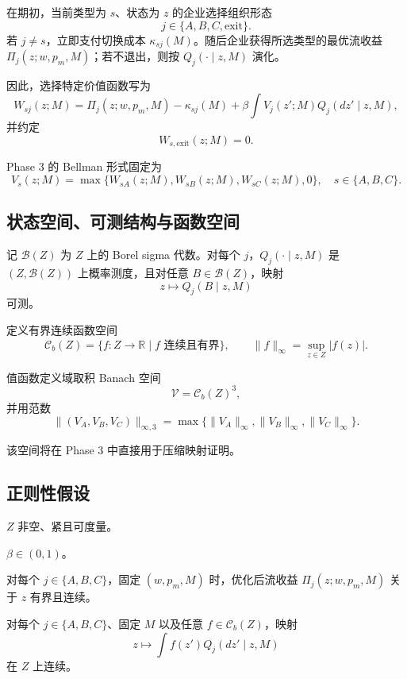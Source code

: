 在期初，当前类型为 $s$、状态为 $z$ 的企业选择组织形态
\[
j\in\{A,B,C,\text{exit}\}.
\]
若 $j\neq s$，立即支付切换成本 $\kappa_{sj}(M)$。随后企业获得所选类型的最优流收益 $\Pi_j(z;w,p_m,M)$；若不退出，则按 $Q_j(\cdot\mid z,M)$ 演化。

因此，选择特定价值函数写为
\[
W_{sj}(z;M)=\Pi_j(z;w,p_m,M)-\kappa_{sj}(M)+\beta\int V_j(z';M)Q_j(dz'\mid z,M),
\]
并约定
\[
W_{s,\text{exit}}(z;M)=0.
\]

Phase 3 的 Bellman 形式固定为
\[
V_s(z;M)=\max\{W_{sA}(z;M),W_{sB}(z;M),W_{sC}(z;M),0\},\quad s\in\{A,B,C\}.
\]

\subsection{状态空间、可测结构与函数空间}

记 $\mathcal B(Z)$ 为 $Z$ 上的 Borel sigma 代数。对每个 $j$，$Q_j(\cdot\mid z,M)$ 是 $(Z,\mathcal B(Z))$ 上概率测度，且对任意 $B\in\mathcal B(Z)$，映射
\[
z\mapsto Q_j(B\mid z,M)
\]
可测。

定义有界连续函数空间
\[
\mathcal C_b(Z)=\{f:Z\to\mathbb R\mid f \text{ 连续且有界}\},
\qquad
\|f\|_\infty=\sup_{z\in Z}|f(z)|.
\]

值函数定义域取积 Banach 空间
\[
\mathcal V=\mathcal C_b(Z)^3,
\]
并用范数
\[
\|(V_A,V_B,V_C)\|_{\infty,3}=\max\{\|V_A\|_\infty,\|V_B\|_\infty,\|V_C\|_\infty\}.
\]

该空间将在 Phase 3 中直接用于压缩映射证明。

\subsection{正则性假设}

\begin{assumption}[A1: 状态空间紧性]
$Z$ 非空、紧且可度量。
\end{assumption}

\begin{assumption}[A2: 折现]
$\beta\in(0,1)$。
\end{assumption}

\begin{assumption}[A3: 流收益正则性]
对每个 $j\in\{A,B,C\}$，固定 $(w,p_m,M)$ 时，优化后流收益 $\Pi_j(z;w,p_m,M)$ 关于 $z$ 有界且连续。
\end{assumption}

\begin{assumption}[A4: 转移核弱连续]
对每个 $j\in\{A,B,C\}$、固定 $M$ 以及任意 $f\in\mathcal C_b(Z)$，映射
\[
z\mapsto \int f(z')Q_j(dz'\mid z,M)
\]
在 $Z$ 上连续。
\end{assumption}

